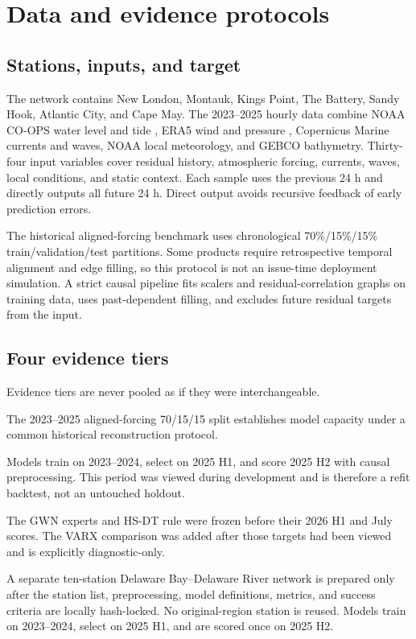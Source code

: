 \documentclass[final,5p,times,twocolumn]{elsarticle}
\begin{document}
\section{Data and evidence protocols}
\subsection{Stations, inputs, and target}
The network contains New London, Montauk, Kings Point, The Battery, Sandy Hook, Atlantic City, and Cape May. The 2023--2025 hourly data combine NOAA CO-OPS water level and tide \citep{noaa_tides}, ERA5 wind and pressure \citep{hersbach2020era5}, Copernicus Marine currents and waves, NOAA local meteorology, and GEBCO bathymetry. Thirty-four input variables cover residual history, atmospheric forcing, currents, waves, local conditions, and static context. Each sample uses the previous 24 h and directly outputs all future 24 h. Direct output avoids recursive feedback of early prediction errors.

The historical aligned-forcing benchmark uses chronological 70\%/15\%/15\% train/validation/test partitions. Some products require retrospective temporal alignment and edge filling, so this protocol is not an issue-time deployment simulation. A strict causal pipeline fits scalers and residual-correlation graphs on training data, uses past-dependent filling, and excludes future residual targets from the input.

\subsection{Four evidence tiers}
Evidence tiers are never pooled as if they were interchangeable.
\begin{description}[leftmargin=0.8cm,style=nextline,itemsep=2pt]
\item[Tier A: retrospective benchmark.] The 2023--2025 aligned-forcing 70/15/15 split establishes model capacity under a common historical reconstruction protocol.
\item[Tier B: 2025 H2 chronological refit.] Models train on 2023--2024, select on 2025 H1, and score 2025 H2 with causal preprocessing. This period was viewed during development and is therefore a refit backtest, not an untouched holdout.
\item[Tier C: 2026 frozen evaluations.] The GWN experts and HS-DT rule were frozen before their 2026 H1 and July scores. The VARX comparison was added after those targets had been viewed and is explicitly diagnostic-only.
\item[Tier D: prospectively locked spatial confirmation.] A separate ten-station Delaware Bay--Delaware River network is prepared only after the station list, preprocessing, model definitions, metrics, and success criteria are locally hash-locked. No original-region station is reused. Models train on 2023--2024, select on 2025 H1, and are scored once on 2025 H2.
\end{description}
\end{document}
